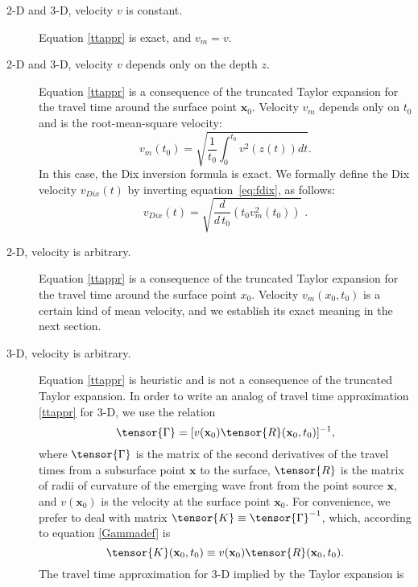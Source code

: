 \begin{description}
\item[2-D and 3-D, velocity $v$ is constant.] 
Equation \ref{ttappr} is exact, and 
$v_m=v$.
\item[2-D and 3-D, velocity $v$ depends only on the depth $z$.]
Equation \ref{ttappr} is a consequence of the truncated Taylor expansion
for the travel time around the surface point $\mathbf{x}_0$. 
Velocity $v_m$ depends only on $t_0$ and is the root-mean-square velocity:
\begin{equation}
\label{eq:fdix}
v_m(t_0)=\sqrt{\frac{1}{t_0}\int_0^{t_0}v^2(z(t))dt}.
\end{equation}
In this case, the Dix inversion formula \cite[]{dix1955} is exact. We
formally define the Dix velocity $v_{Dix}(t)$ by inverting
equation~\ref{eq:fdix}, as follows:
\begin{equation}
\label{eq:dix}
v_{Dix}(t)=\sqrt{\frac{d}{d\,t_0}\left(t_0 v_m^2(t_0)\right)}\;.
\end{equation}
\item[2-D, velocity is arbitrary.]
Equation \ref{ttappr} is a consequence of the truncated Taylor expansion
for the travel time around the surface point $x_0$. 
Velocity $v_m(x_0,t_0)$ is a certain kind of mean velocity, and
we establish its exact meaning in the next section.
\item[3-D, velocity is arbitrary.]
Equation \ref{ttappr} is  heuristic and is not a consequence of the
truncated Taylor expansion. In order to write an analog of 
travel time approximation \ref{ttappr} for 3-D, we use the
relation \cite[]{hubralkrey} 
\begin{equation}
\label{Gammadef}
\tensor{\Gamma}=[v(\mathbf{x}_0)\tensor{R}(\mathbf{x}_0,t_0)]^{-1},
\end{equation}
where $\tensor{\Gamma}$ is the matrix
of the second derivatives of the travel times 
from a subsurface point $\mathbf{x}$ to the surface,
$\tensor{R}$ is the matrix of radii of curvature of the emerging wave front
from the point source $\mathbf{x}$, and $v(\mathbf{x}_0)$ is 
the velocity at the surface point $\mathbf{x}_0$.
For convenience, we prefer to deal with matrix 
$\tensor{K}\equiv\tensor{\Gamma}^{-1}$,
which, according to equation \ref{Gammadef} is
\begin{equation}
\label{Kdef}
\tensor{K}(\mathbf{x}_0,t_0)\equiv v(\mathbf{x}_0)\tensor{R}(\mathbf{x}_0,t_0).
\end{equation}
The travel time approximation for 3-D implied by the Taylor expansion is
\begin{eqnarray}

\end{eqnarray}
\end{description}
